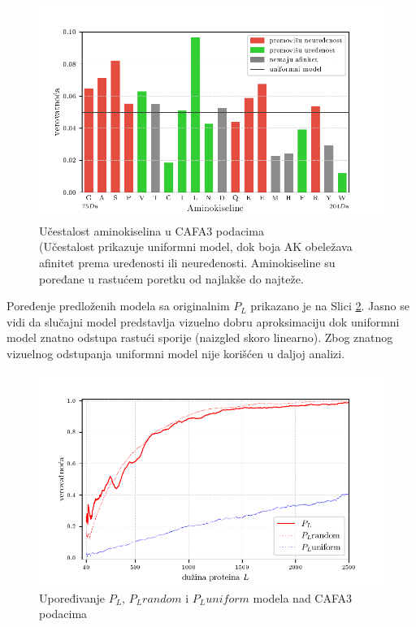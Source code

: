 \begin{figure}[th]
\centering
\includegraphics[]{plots/AK_ucestalost}
\caption{
  Učestalost aminokiselina u CAFA3 podacima
  \\ \footnotesize
  (Učestalost prikazuje uniformni model, dok boja AK obeležava afinitet prema
  uređenosti ili neuređenosti. Aminokiseline su poređane u rastućem poretku
  od najlakše do najteže. 
}
\label{fig:AK_ucestalost}
\end{figure}

Poređenje predloženih modela sa originalnim $P_L$ prikazano je na Slici
\ref{fig:PL2}. Jasno se vidi da slučajni model predstavlja vizuelno dobru
aproksimaciju dok uniformni model znatno odstupa rastući sporije (naizgled
skoro linearno).
Zbog znatnog vizuelnog odstupanja uniformni model nije korišćen u daljoj analizi.


\begin{figure}[th]
\centering
\includegraphics[]{plots/PL_F_cmp}
\caption{Upoređivanje $P_L$, $P_L random$ i $P_L uniform$ modela nad CAFA3 podacima}
\label{fig:PL2}
\end{figure}


